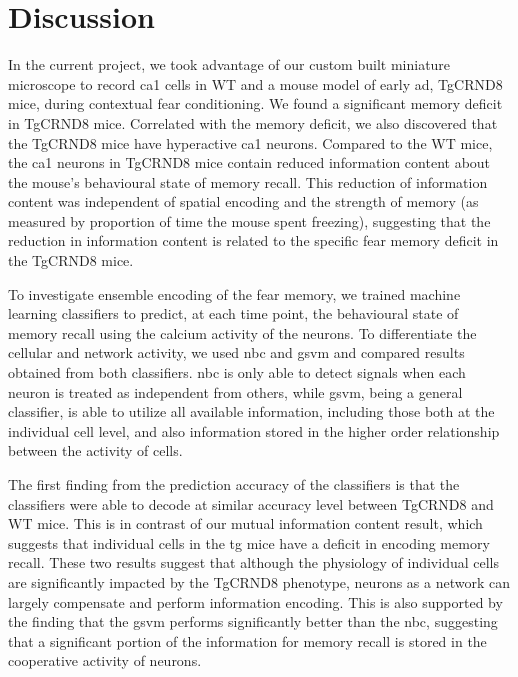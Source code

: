 \section{Discussion}


In the current project, we took advantage of our custom built miniature microscope to record \gls{ca1} cells in WT and a mouse model of early \gls{ad}, TgCRND8 mice, during contextual fear conditioning. We found a significant memory deficit in TgCRND8 mice. Correlated with the memory deficit, we also discovered that the TgCRND8 mice have hyperactive \gls{ca1} neurons. Compared to the WT mice, the \gls{ca1} neurons in TgCRND8 mice contain reduced information content about the mouse's behavioural state of memory recall. This reduction of information content was independent of spatial encoding and the strength of memory (as measured by proportion of time the mouse spent freezing), suggesting that the reduction in information content is related to the specific fear memory deficit in the TgCRND8 mice.

To investigate ensemble encoding of the fear memory, we trained machine learning classifiers to predict, at each time point, the behavioural state of memory recall using the calcium activity of the neurons. To differentiate the cellular and network activity, we used \gls{nbc} and \gls{gsvm} and compared results obtained from both classifiers. \Gls{nbc} is only able to detect signals when each neuron is treated as independent from others, while \gls{gsvm}, being a general classifier, is able to utilize all available information, including those both at the individual cell level, and also information stored in the higher order relationship between the activity of cells. 

The first finding from the prediction accuracy of the classifiers is that the classifiers were able to decode at similar accuracy level between TgCRND8 and WT mice. This is in contrast of our mutual information content result, which suggests that individual cells in the \gls{tg} mice have a deficit in encoding memory recall. These two results suggest that although the physiology of individual cells are significantly impacted by the TgCRND8 phenotype, neurons as a network can largely compensate and perform information encoding. This is also supported by the finding that the \gls{gsvm} performs significantly better than the \gls{nbc}, suggesting that a significant portion of the information for memory recall is stored in the cooperative activity of neurons. 

